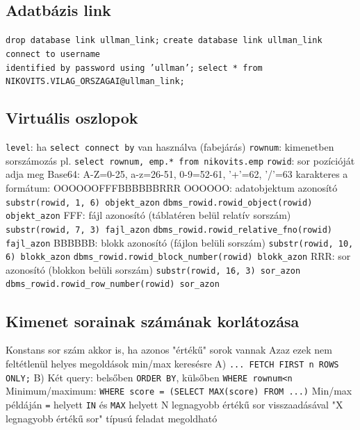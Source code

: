 \documentclass[12pt,a4paper]{article}
\begin{document}
\subsection{Adatbázis link}

\begin{outline}
	\1 \texttt{drop database link ullman\_link;}
	\1 \texttt{create database link ullman\_link connect to username\\identified by password using 'ullman';}
	\1 \texttt{select * from NIKOVITS.VILAG\_ORSZAGAI@ullman\_link;}
\end{outline}

\pagebreak

\subsection{Virtuális oszlopok}

\begin{outline}
	\1 \texttt{level}: ha \texttt{select connect by} van használva (fabejárás)
	\1 \texttt{rownum}: kimenetben sorszámozás
		\2 pl. \texttt{select rownum, emp.* from nikovits.emp}
	\1 \texttt{rowid}: sor pozícióját adja meg
		\2 Base64: A-Z=0-25, a-z=26-51, 0-9=52-61, '+'=62, '/'=63
		 karakteres a formátum: OOOOOOFFFBBBBBBRRR
		\2 OOOOOO: adatobjektum azonosító
			\3 \texttt{substr(rowid, 1, 6) objekt\_azon}
			\3 \texttt{dbms\_rowid.rowid\_object(rowid) objekt\_azon}
		\2 FFF: fájl azonosító (táblatéren belül relatív sorszám)
			\3 \texttt{substr(rowid, 7, 3) fajl\_azon}
			\3 \texttt{dbms\_rowid.rowid\_relative\_fno(rowid) fajl\_azon}
		\2 BBBBBB: blokk azonosító (fájlon belüli sorszám)
			\3 \texttt{substr(rowid, 10, 6) blokk\_azon}
			\3 \texttt{dbms\_rowid.rowid\_block\_number(rowid) blokk\_azon}
		\2 RRR: sor azonosító (blokkon belüli sorszám)
			\3 \texttt{substr(rowid, 16, 3) sor\_azon}
			\3 \texttt{dbms\_rowid.rowid\_row\_number(rowid) sor\_azon}
\end{outline}

\subsection{Kimenet sorainak számának korlátozása}

\begin{outline}
	\1 Konstans sor szám akkor is, ha azonos "értékű" sorok vannak
		\2 Azaz ezek nem feltétlenül helyes megoldások min/max keresésre
		\2 A) \texttt{... FETCH FIRST n ROWS ONLY;}
		\2 B) Két query: belsőben \texttt{ORDER BY}, külsőben \texttt{WHERE rownum<n}
	\1 Minimum/maximum: \texttt{WHERE score = (SELECT MAX(score) FROM ...)}
	\1 Min/max példáján \texttt{=} helyett \texttt{IN} és \texttt{MAX} helyett N legnagyobb értékű sor visszaadásával "X legnagyobb értékű sor" típusú feladat megoldható
\end{outline}
\end{document}
